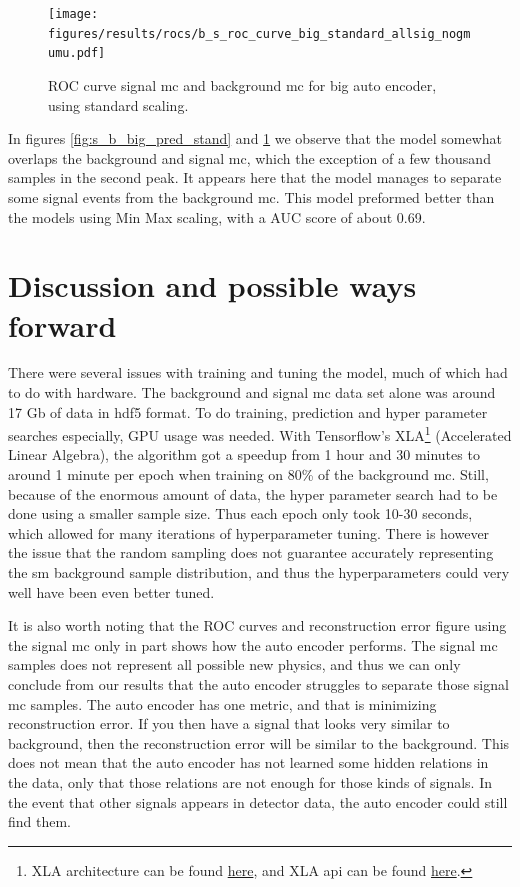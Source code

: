 \documentclass[ reprint, amsmath,amssymb, aps, nofootinbib]{revtex4-2}
\begin{document}
\begin{figure}[H]
    \centering
         \texttt{[image: figures/results/rocs/b\_s\_roc\_curve\_big\_standard\_allsig\_nogmumu.pdf]}
         \caption{ROC curve signal mc and background mc for big auto encoder, using standard scaling.}
         \label{fig:s_b_big_roc_stand}
\end{figure}



In figures \ref{fig:s_b_big_pred_stand} and \ref{fig:s_b_big_roc_stand} we observe that the model somewhat overlaps the background and signal mc, which the exception of a few thousand samples in the second peak. It appears here that the model manages to separate some signal events from the background mc. This model preformed better than the models using Min Max scaling, with a AUC score of about 0.69. \par 

\section{Discussion and possible ways forward}
There were several issues with training and tuning the model, much of which had to do with hardware. The background and signal mc data set alone was around 17 Gb of data in hdf5 format. To do training, prediction and hyper parameter searches especially, GPU usage was needed. With Tensorflow's XLA\footnote{XLA architecture can be found \href{https://www.tensorflow.org/xla/architecture}{here}, and XLA api can be found \href{https://www.tensorflow.org/xla}{here}.} (Accelerated Linear Algebra), the algorithm got a speedup from 1 hour and 30 minutes to around 1 minute per epoch when training on 80\% of the background mc. Still, because of the enormous amount of data, the hyper parameter search had to be done using a smaller sample size. Thus each epoch only took 10-30 seconds, which allowed for many iterations of hyperparameter tuning. There is however the issue that the random sampling does not guarantee accurately representing the sm background sample distribution, and thus the hyperparameters could very well have been even better tuned.  \par \par

It is also worth noting that the ROC curves and reconstruction error figure using the signal mc only in part shows how the auto encoder performs. The signal mc samples does not represent all possible new physics, and thus we can only conclude from our results that the auto encoder struggles to separate those signal mc samples. The auto encoder has one metric, and that is minimizing reconstruction error. If you then have a signal that looks very similar to background, then the reconstruction error will be similar to the background. This does not mean that the auto encoder has not learned some hidden relations in the data, only that those relations are not enough for those kinds of signals. In the event that other signals appears in detector data, the auto encoder could still find them. \par \par
\end{document}
